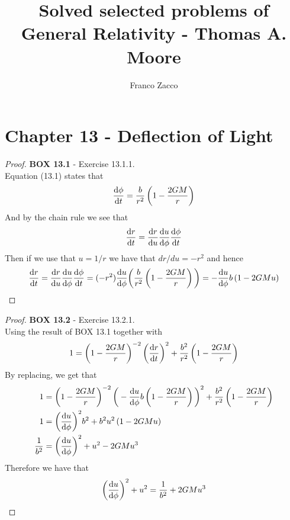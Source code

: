 \documentclass[11pt]{article}
\title{\textbf{Solved selected problems of General Relativity - Thomas A. Moore}}
\author{Franco Zacco}
\date{}
\theoremstyle{definition}
\begin{document}
\maketitle
\thispagestyle{empty}

\section*{Chapter 13 - Deflection of Light}

\begin{proof}{\textbf{BOX 13.1} - Exercise 13.1.1.}\\
Equation (13.1) states that
\begin{align*}
    \dv{\phi}{t} = \frac{b}{r^2}\left(1 - \frac{2GM}{r}\right)
\end{align*}
And by the chain rule we see that
\begin{align*}
    \dv{r}{t} = \dv{r}{u}\dv{u}{\phi}\dv{\phi}{t}
\end{align*}
Then if we use that $u = 1/r$ we have that $dr/du = -r^2$ and hence 
\begin{align*}
    \dv{r}{t} = \dv{r}{u}\dv{u}{\phi}\dv{\phi}{t}
    = (-r^2)\dv{u}{\phi}\bigg(\frac{b}{r^2}\left(1 - \frac{2GM}{r}\right)\bigg)
    = -\dv{u}{\phi}b\left(1 - 2GMu\right) 
\end{align*}
\end{proof}
\begin{proof}{\textbf{BOX 13.2} - Exercise 13.2.1.}\\
Using the result of BOX 13.1 together with 
\begin{align*}
    1 = \left(1 - \frac{2GM}{r}\right)^{-2} \bigg(\dv{r}{t}\bigg)^2 
    + \frac{b^2}{r^2}\left(1 - \frac{2GM}{r}\right)
\end{align*}
By replacing, we get that
\begin{align*}
    1 &= \left(1 - \frac{2GM}{r}\right)^{-2}
    \bigg(-\dv{u}{\phi}b\left(1 - \frac{2GM}{r}\right)\bigg)^2 
    + \frac{b^2}{r^2}\left(1 - \frac{2GM}{r}\right)\\
    1 &= \bigg(\dv{u}{\phi}\bigg)^2b^2 
    + b^2u^2\left(1 - 2GMu\right)\\
    \frac{1}{b^2} &= \bigg(\dv{u}{\phi}\bigg)^2 + u^2 - 2GMu^3
\end{align*}
Therefore we have that
\begin{align*}
    \bigg(\dv{u}{\phi}\bigg)^2 + u^2 = \frac{1}{b^2} + 2GMu^3
\end{align*}
\end{proof}
\cleardoublepage
\end{document}
